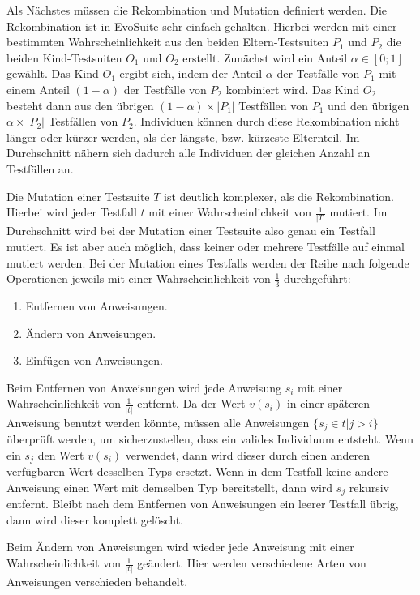 \documentclass[a4paper,11pt]{article}
\begin{document}
Als Nächstes müssen die Rekombination und Mutation definiert werden.
Die Rekombination ist in EvoSuite sehr einfach gehalten.
Hierbei werden mit einer bestimmten Wahrscheinlichkeit aus den beiden Eltern-Testsuiten $P_1$ und $P_2$ die beiden Kind-Testsuiten $O_1$ und $O_2$ erstellt.
Zunächst wird ein Anteil $\alpha \in [0;1]$ gewählt.
Das Kind $O_1$ ergibt sich, indem der Anteil $\alpha$ der Testfälle von $P_1$ mit einem Anteil $(1 - \alpha)$ der Testfälle von $P_2$ kombiniert wird.
Das Kind $O_2$ besteht dann aus den übrigen $(1 - \alpha) \times |P_1|$ Testfällen von $P_1$ und den übrigen $\alpha \times |P_2|$ Testfällen von $P_2$.
Individuen können durch diese Rekombination nicht länger oder kürzer werden, als der längste, bzw. kürzeste Elternteil.
Im Durchschnitt nähern sich dadurch alle Individuen der gleichen Anzahl an Testfällen an.

Die Mutation einer Testsuite $T$ ist deutlich komplexer, als die Rekombination.
Hierbei wird jeder Testfall $t$ mit einer Wahrscheinlichkeit von $\frac{1}{|T|}$ mutiert.
Im Durchschnitt wird bei der Mutation einer Testsuite also genau ein Testfall mutiert.
Es ist aber auch möglich, dass keiner oder mehrere Testfälle auf einmal mutiert werden. Bei der Mutation eines Testfalls werden der Reihe nach folgende Operationen jeweils mit einer Wahrscheinlichkeit von $\frac{1}{3}$ durchgeführt:
\begin{enumerate}
	\item Entfernen von Anweisungen.
	\item Ändern von Anweisungen.
	\item Einfügen von Anweisungen.
\end{enumerate}

Beim Entfernen von Anweisungen wird jede Anweisung $s_i$ mit einer Wahrscheinlichkeit von $\frac{1}{|t|}$ entfernt.
Da der Wert $v(s_i)$ in einer späteren Anweisung benutzt werden könnte, müssen alle Anweisungen $\{s_j \in t | j > i\}$ überprüft werden, um sicherzustellen, dass ein valides Individuum entsteht.
Wenn ein $s_j$ den Wert $v(s_i)$ verwendet, dann wird dieser durch einen anderen verfügbaren Wert desselben Typs ersetzt.
Wenn in dem Testfall keine andere Anweisung einen Wert mit demselben Typ bereitstellt, dann wird $s_j$ rekursiv entfernt.
Bleibt nach dem Entfernen von Anweisungen ein leerer Testfall übrig, dann wird dieser komplett gelöscht.

Beim Ändern von Anweisungen wird wieder jede Anweisung mit einer Wahrscheinlichkeit von $\frac{1}{|t|}$ geändert.
Hier werden verschiedene Arten von Anweisungen verschieden behandelt.
\end{document}
